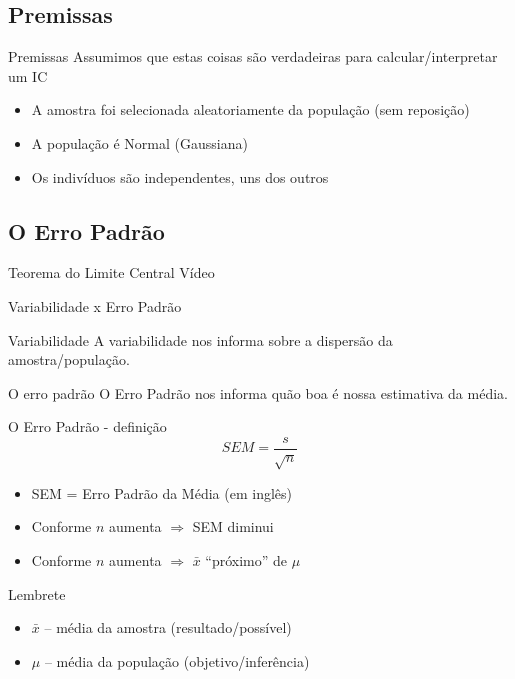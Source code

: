 \documentclass{beamer}
\begin{document}
\subsection{Premissas}

\begin{frame}{\scriptsize Premissas}
  \scriptsize
  Assumimos que estas coisas são verdadeiras para calcular/interpretar um IC
  \bigskip
  \bigskip
  \begin{itemize}
    \scriptsize
  \item A amostra foi selecionada aleatoriamente da população (sem reposição)
  \medskip
  \item A população é Normal (Gaussiana)
  \medskip
  \item Os indivíduos são independentes, uns dos outros
  \end{itemize}
\end{frame}

\subsection{O Erro Padrão}

\begin{frame}{\scriptsize Teorema do Limite Central}
  Vídeo
\end{frame}

\begin{frame}{\scriptsize Variabilidade x Erro Padrão}
  \begin{block}{Variabilidade}
    \footnotesize
    A variabilidade nos informa sobre a dispersão da amostra/população.
  \end{block}
  \begin{block}{O erro padrão}
    \footnotesize
    O Erro Padrão nos informa quão boa é nossa \alert{estimativa} da média.
  \end{block}
\end{frame}

\begin{frame}{\scriptsize O Erro Padrão - definição}
  \begin{displaymath}
    SEM = \frac{s}{\sqrt{n}}
  \end{displaymath}
  \bigskip
  \begin{itemize}
    \scriptsize
  \item SEM = Erro Padrão da Média ({\tiny em inglês})
    \medskip
  \item Conforme $n$ aumenta $\Rightarrow$ SEM diminui
    \medskip
  \item Conforme $n$ aumenta $\Rightarrow$ $\bar{x}$ ``próximo'' de $\mu$
  \end{itemize}
  \bigskip
  \begin{block}{Lembrete}
    \tiny
    \begin{itemize}
    \footnotesize
    \item $\bar{x}$ -- média da amostra (resultado/possível)
    \item $\mu$ -- média da população (objetivo/inferência)
    \end{itemize}
  \end{block}
\end{frame}
\end{document}
